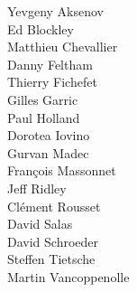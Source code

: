 Yevgeny Aksenov       \\
Ed Blockley           \\
Matthieu Chevallier   \\
Danny Feltham         \\
Thierry Fichefet      \\
Gilles Garric         \\
Paul Holland          \\
Dorotea Iovino        \\
Gurvan Madec          \\
Fran\c cois Massonnet \\
Jeff Ridley           \\
Cl\'ement Rousset     \\
David Salas           \\
David Schroeder       \\
Steffen Tietsche      \\
Martin Vancoppenolle
